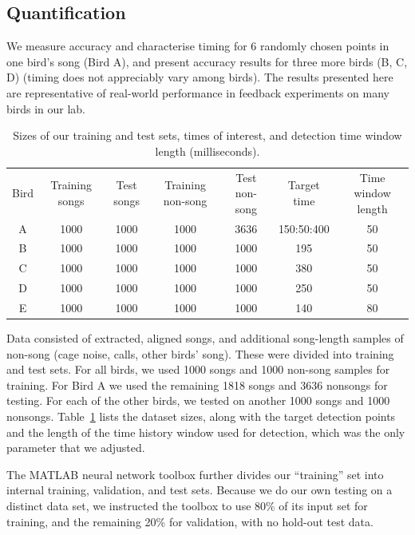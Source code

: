 \documentclass[10pt,letterpaper]{article}
\begin{document}
\subsection{Quantification}
\label{sec:quantify}

We measure accuracy and characterise timing for 6 randomly chosen
points in one bird's song (Bird A), and present accuracy results for
three more birds (B, C, D) (timing does not appreciably vary among
birds). The results presented here are representative of real-world
performance in feedback experiments on many birds in our lab.


\begin{table}
 \begin{tabular}{c|cccccc}
    Bird & Training songs & Test songs & Training non-song & Test non-song & Target time  & Time window length\\ %
   A & 1000 & 1000 & 1000 & 3636 & 150:50:400 & 50 \\
   B & 1000 & 1000 & 1000 & 1000 & 195 & 50 \\
    C & 1000 & 1000 & 1000 & 1000 & 380 & 50 \\
    D & 1000 & 1000 &  1000 & 1000 & 250 & 50 \\
    E & 1000 & 1000 & 1000 & 1000 & 140 & 80
  \end{tabular}
  \caption{Sizes of our training and test sets, times of interest, and detection time window length (milliseconds).}
  \label{table:datasizes}
\end{table}

Data consisted of extracted, aligned songs, and additional song-length
samples of non-song (cage noise, calls, other birds' song). These were
divided into training and test sets. For all birds, we used 1000 songs
and 1000 non-song samples for training. For Bird A we used the
remaining 1818 songs and 3636 nonsongs for testing. For each of the
other birds, we tested on another 1000 songs and 1000
nonsongs. Table~\ref{table:datasizes} lists the dataset sizes, along
with the target detection points and the length of the time history
window used for detection, which was the only parameter that we
adjusted.

The MATLAB neural network toolbox further divides our ``training'' set
into internal training, validation, and test sets.  Because we do our
own testing on a distinct data set, we instructed the
toolbox to use 80\% of its input set for training, and the
remaining 20\% for validation, with no hold-out test data.
\end{document}
